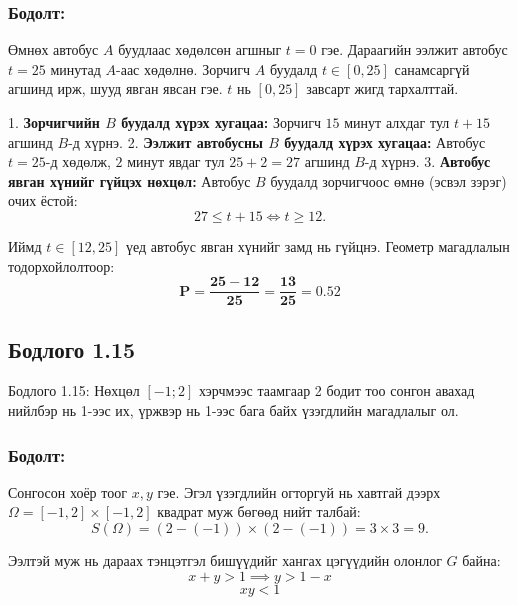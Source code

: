 \documentclass[11pt,a4paper]{article}
\begin{document}
\subsubsection*{Бодолт:}

Өмнөх автобус $A$ буудлаас хөдөлсөн агшныг $t = 0$ гэе. Дараагийн ээлжит автобус $t = 25$ минутад $A$-аас хөдөлнө.
Зорчигч $A$ буудалд $t \in [0, 25]$ санамсаргүй агшинд ирж, шууд явган явсан гэе. $t$ нь $[0, 25]$ завсарт жигд тархалттай.

1. 				\textbf{Зорчигчийн $B$ буудалд хүрэх хугацаа:}
   Зорчигч $15$ минут алхдаг тул $t + 15$ агшинд $B$-д хүрнэ.
2. 				\textbf{Ээлжит автобусны $B$ буудалд хүрэх хугацаа:}
   Автобус $t = 25$-д хөдөлж, $2$ минут явдаг тул $25 + 2 = 27$ агшинд $B$-д хүрнэ.
3. 				\textbf{Автобус явган хүнийг гүйцэх нөхцөл:}
   Автобус $B$ буудалд зорчигчоос өмнө (эсвэл зэрэг) очих ёстой:
   \[
     27 \le t + 15 \iff t \ge 12.
   \]

Иймд $t \in [12, 25]$ үед автобус явган хүнийг замд нь гүйцнэ. Геометр магадлалын тодорхойлолтоор:
\[
  \mathbf{P = \frac{25 - 12}{25} = \frac{13}{25} = 0.52}
\]

\vspace{0.8em}

\subsection*{Бодлого 1.15}

\begin{problembox}{Бодлого 1.15: Нөхцөл}
$[-1; 2]$ хэрчмээс таамгаар 2 бодит тоо сонгон авахад нийлбэр нь 1-ээс их, үржвэр нь 1-ээс бага байх үзэгдлийн магадлалыг ол.
\end{problembox}

\subsubsection*{Бодолт:}

Сонгосон хоёр тоог $x, y$ гэе.
Эгэл үзэгдлийн огторгуй нь хавтгай дээрх $\Omega = [-1, 2] \times [-1, 2]$ квадрат муж бөгөөд нийт талбай:
\[
  S(\Omega) = (2 - (-1)) \times (2 - (-1)) = 3 \times 3 = 9.
\]

Ээлтэй муж нь дараах тэнцэтгэл бишүүдийг хангах цэгүүдийн олонлог $G$ байна:
\[
  x + y > 1 \implies y > 1 - x
\]
\[
  x y < 1
\]
\end{document}
